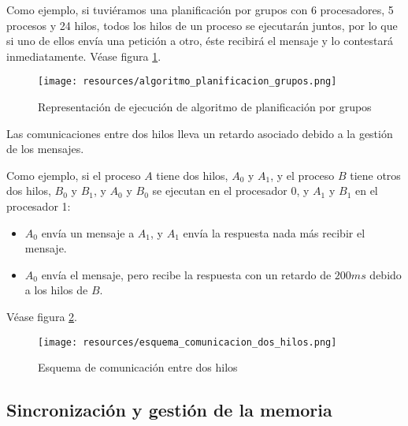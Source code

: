 \documentclass[a4paper, 11pt, titlepage]{article}
\begin{document}
                    Como ejemplo, si tuviéramos una planificación por grupos con 6 procesadores, 5 procesos y 24 hilos, 
                    todos los hilos de un proceso se ejecutarán juntos, por lo que si uno de ellos envía una petición 
                    a otro, éste recibirá el mensaje y lo contestará inmediatamente. Véase figura \ref{algoritmo_planificacion_grupos}.

                    \begin{figure}[htp]
                        \centering
                        \texttt{[image: resources/algoritmo\_planificacion\_grupos.png]}
                        \caption{Representación de ejecución de algoritmo de planificación por grupos}
                        \label{algoritmo_planificacion_grupos}
                    \end{figure}
                
                    Las comunicaciones entre dos hilos lleva un retardo asociado debido a la gestión de los mensajes.
    
                    Como ejemplo, si el proceso $A$ tiene dos hilos, $A_0$ y $A_1$, y el proceso $B$ tiene otros dos hilos,
                    $B_0$ y $B_1$, y $A_0$ y $B_0$ se ejecutan en el procesador 0, y $A_1$ y $B_1$ en el procesador 1:

                    \begin{itemize}
                        \item $A_0$ envía un mensaje a $A_1$, y $A_1$ envía la respuesta nada más recibir el mensaje.
                        \item $A_0$ envía el mensaje, pero recibe la respuesta con un retardo de $200ms$ debido a los hilos de $B$.
                    \end{itemize}

                    Véase figura \ref{esquema_comunicacion_dos_hilos}.

                    \begin{figure}[htp]
                        \centering
                        \texttt{[image: resources/esquema\_comunicacion\_dos\_hilos.png]}
                        \caption{Esquema de comunicación entre dos hilos}
                        \label{esquema_comunicacion_dos_hilos}
                    \end{figure}

    \subsection{Sincronización y gestión de la memoria}
\end{document}
